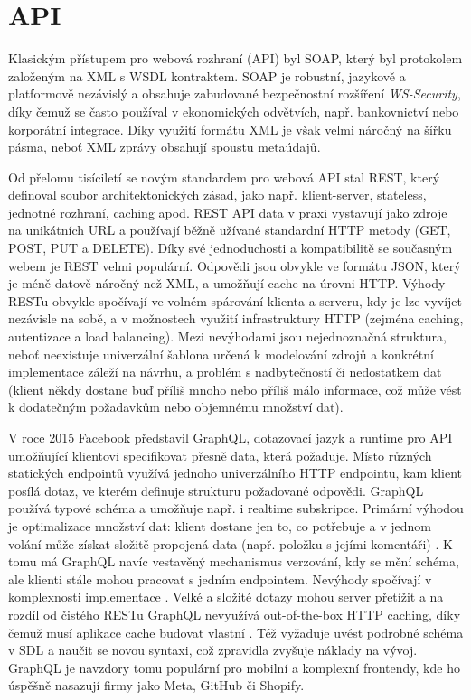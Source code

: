 \newpage

\section{API}
\label{sec:research-api}

Klasickým přístupem pro webová rozhraní (API) byl SOAP, který byl protokolem
založeným na XML s WSDL kontraktem. SOAP je robustní, jazykově a platformově
nezávislý a obsahuje zabudované bezpečnostní rozšíření \emph{WS-Security},
díky čemuž se často používal v ekonomických odvětvích, např. bankovnictví
nebo korporátní integrace. Díky využití formátu XML je však velmi náročný
na šířku pásma, neboť XML zprávy obsahují spoustu metaúdajů.
\cite{YHVfLHsNlUItkF6G,Sj7FFY7SXnJ6m41T} %

Od přelomu tisíciletí se novým standardem pro webová API stal REST, který
definoval soubor architektonických zásad, jako např. klient-server, stateless,
jednotné rozhraní, caching apod. REST API data v praxi vystavují jako zdroje
na unikátních URL a používají běžně užívané standardní HTTP metody (GET, POST,
PUT a DELETE). Díky své jednoduchosti a kompatibilitě se současným webem
je REST velmi populární. Odpovědi jsou obvykle ve formátu JSON, který je méně
datově náročný než XML, a umožňují cache na úrovni HTTP. Výhody RESTu obvykle
spočívají ve volném spárování klienta a serveru, kdy je lze vyvíjet nezávisle
na sobě, a v možnostech využití infrastruktury HTTP (zejména caching,
autentizace a load balancing). Mezi nevýhodami jsou nejednoznačná struktura,
neboť neexistuje univerzální šablona určená k modelování zdrojů a konkrétní
implementace záleží na návrhu, a problém s nadbytečností či nedostatkem dat
(klient někdy dostane buď příliš mnoho nebo příliš málo informace,
což může vést k dodatečným požadavkům nebo objemnému množství dat).
\cite{YHVfLHsNlUItkF6G,Sj7FFY7SXnJ6m41T} %

V roce 2015 Facebook představil GraphQL, dotazovací jazyk a runtime pro API
umožňující klientovi specifikovat přesně data, která požaduje. Místo různých
statických endpointů využívá jednoho univerzálního HTTP endpointu, kam klient
posílá dotaz, ve kterém definuje strukturu požadované odpovědi. GraphQL
používá typové schéma a umožňuje např. i realtime subskripce. Primární výhodou
je optimalizace množství dat: klient dostane jen to, co potřebuje a v jednom
volání může získat složitě propojená data (např. položku s jejími komentáři)
\cite{YHVfLHsNlUItkF6G,Sj7FFY7SXnJ6m41T}. %
K tomu má GraphQL navíc vestavěný mechanismus verzování, kdy se mění schéma,
ale klienti stále mohou pracovat s jedním endpointem.
Nevýhody spočívají v komplexnosti implementace
\cite{YHVfLHsNlUItkF6G,Sj7FFY7SXnJ6m41T}. %
Velké a složité dotazy mohou server přetížit a na rozdíl od čistého RESTu
GraphQL nevyužívá out-of-the-box HTTP caching, díky čemuž musí aplikace cache
budovat vlastní \cite{YHVfLHsNlUItkF6G,Sj7FFY7SXnJ6m41T}. %
Též vyžaduje uvést podrobné schéma v SDL a naučit se novou syntaxi,
což zpravidla zvyšuje náklady na vývoj. GraphQL je navzdory tomu populární
pro mobilní a komplexní frontendy, kde ho úspěšně nasazují firmy jako Meta,
GitHub či Shopify.

